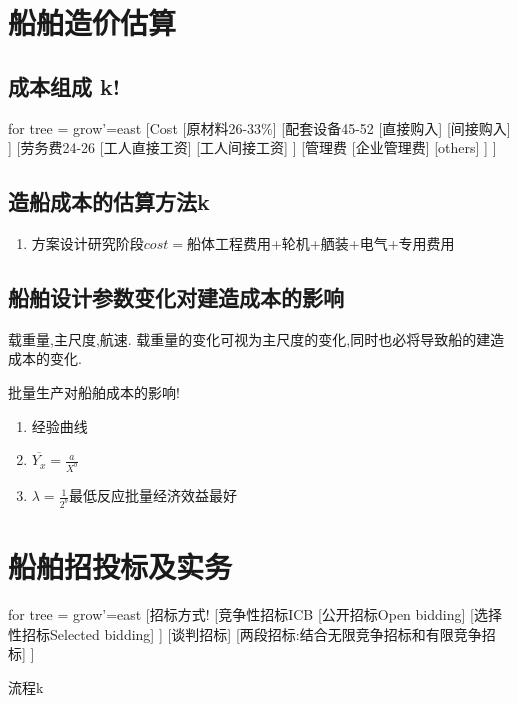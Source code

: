 \documentclass[UTF8,a4paper]{ctexart}
\begin{document}
	\section{船舶造价估算}
		\subsection{成本组成 k!}
		\begin{forest}
			for tree = {grow'=east}
			[Cost [原材料26-33\%]
					[配套设备45-52
						[直接购入]
						[间接购入]
						]
					[劳务费24-26
						[工人直接工资]
						[工人间接工资]
						]
					[管理费
						[企业管理费]
						[others]
						]
				]
		\end{forest}
	
		\subsection{造船成本的估算方法k}
			\begin{enumerate}
				\item 方案设计研究阶段$cost=$船体工程费用+轮机+舾装+电气+专用费用
			\end{enumerate}
		
		\subsection{船舶设计参数变化对建造成本的影响}
		载重量,主尺度,航速. 载重量的变化可视为主尺度的变化,同时也必将导致船的建造成本的变化.
		
		批量生产对船舶成本的影响!
			\begin{enumerate}[$\cdot$]
				\item 经验曲线
				\item $\overline{Y_x}=\frac{a}{X^b}$
				\item $\lambda=\frac{1}{2^b}$最低反应批量经济效益最好
			\end{enumerate}
		
	\section{船舶招投标及实务}
		\begin{forest}
			for tree = {grow'=east}
			[招标方式!
					[竞争性招标ICB
						[公开招标Open bidding]
						[选择性招标Selected bidding]
					]
				[谈判招标]
				[两段招标:结合无限竞争招标和有限竞争招标]
				]
		\end{forest}
	
		
		流程k
		
\end{document}
